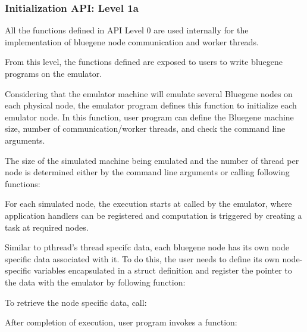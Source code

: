 \subsubsection{Initialization API: Level 1a}

All the functions defined in API Level 0 are used internally for the 
implementation of bluegene node communication and worker threads.

From this level, the functions defined are exposed to users to write bluegene
programs on the emulator.

Considering that the emulator machine will emulate several Bluegene nodes on
each physical node, the emulator program defines this function 
 to initialize each emulator
node. In this function, user program can define the Bluegene machine size,
number of communication/worker threads, and check the command line arguments.

The size of the simulated machine being emulated and the number of thread per
node is determined either by the command line arguments or calling following
functions:





For each simulated node, the execution starts at 
 called by the emulator,
where application handlers can be registered and computation 
is triggered by creating a task at required nodes.

Similar to pthread's thread specifc data, each bluegene node has its
own node specific data associated with it. To do this, the user needs to define its 
own node-specific variables encapsulated in a struct definition and register
 the pointer to the data with the emulator by following function:


To retrieve the node specific data, call:


After completion of execution, user program invokes a function:


